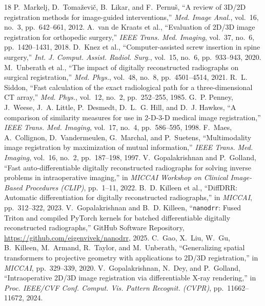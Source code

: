\documentclass[journal,twoside,web]{ieeecolor}
\begin{document}

\begin{thebibliography}{18}
P.~Markelj, D.~Toma\v{z}evi\v{c}, B.~Likar, and F.~Pernu\v{s}, ``A review of 3D/2D registration methods for image-guided interventions,'' \emph{Med. Image Anal.}, vol.~16, no.~3, pp.~642--661, 2012.
A.~van de Kraats et al., ``Evaluation of 2D/3D image registration for orthopedic surgery,'' \emph{IEEE Trans. Med. Imaging}, vol.~37, no.~6, pp.~1420--1431, 2018.
D.~Knez et al., ``Computer-assisted screw insertion in spine surgery,'' \emph{Int. J. Comput. Assist. Radiol. Surg.}, vol.~15, no.~6, pp.~933--943, 2020.
M.~Unberath et al., ``The impact of digitally reconstructed radiographs on surgical registration,'' \emph{Med. Phys.}, vol.~48, no.~8, pp.~4501--4514, 2021.
R.~L. Siddon, ``Fast calculation of the exact radiological path for a three-dimensional CT array,'' \emph{Med. Phys.}, vol.~12, no.~2, pp.~252--255, 1985.
G.~P. Penney, J.~Weese, J.~A. Little, P.~Desmedt, D.~L.~G. Hill, and D.~J. Hawkes, ``A comparison of similarity measures for use in 2-D-3-D medical image registration,'' \emph{IEEE Trans. Med. Imaging}, vol.~17, no.~4, pp.~586--595, 1998.
F.~Maes, A.~Collignon, D.~Vandermeulen, G.~Marchal, and P.~Suetens, ``Multimodality image registration by maximization of mutual information,'' \emph{IEEE Trans. Med. Imaging}, vol.~16, no.~2, pp.~187--198, 1997.
V.~Gopalakrishnan and P.~Golland, ``Fast auto-differentiable digitally reconstructed radiographs for solving inverse problems in intraoperative imaging,'' in \emph{MICCAI Workshop on Clinical Image-Based Procedures (CLIP)}, pp.~1--11, 2022.
B.~D. Killeen et al., ``DiffDRR: Automatic differentiation for digitally reconstructed radiographs,'' in \emph{MICCAI}, pp.~312--322, 2023.
V.~Gopalakrishnan and B.~D. Killeen, ``\texttt{nanodrr}: Fused Triton and compiled PyTorch kernels for batched differentiable digitally reconstructed radiographs,'' GitHub Software Repository, \url{https://github.com/eigenvivek/nanodrr}, 2025.
C.~Gao, X.~Liu, W.~Gu, B.~Killeen, M.~Armand, R.~Taylor, and M.~Unberath, ``Generalizing spatial transformers to projective geometry with applications to 2D/3D registration,'' in \emph{MICCAI}, pp.~329--339, 2020.
V.~Gopalakrishnan, N.~Dey, and P.~Golland, ``Intraoperative 2D/3D image registration via differentiable X-ray rendering,'' in \emph{Proc. IEEE/CVF Conf. Comput. Vis. Pattern Recognit. (CVPR)}, pp.~11662--11672, 2024.

\end{thebibliography}
\end{document}
